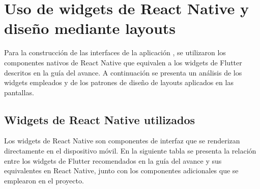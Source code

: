 
\section{Uso de widgets de React Native y dise\~no mediante layouts}

Para la construcci\'on de las interfaces de la aplicaci\'on \nombreApp{}, se
utilizaron los componentes nativos de React Native que equivalen a los widgets
de Flutter descritos en la gu\'ia del avance. A continuaci\'on se presenta un
an\'alisis de los widgets empleados y de los patrones de dise\~no de layouts
aplicados en las pantallas.

\subsection{Widgets de React Native utilizados}

Los widgets de React Native son componentes de interfaz que se renderizan
directamente en el dispositivo m\'ovil. En la siguiente tabla se presenta la
relaci\'on entre los widgets de Flutter recomendados en la gu\'ia del avance y
sus equivalentes en React Native, junto con los componentes adicionales que se
emplearon en el proyecto.

